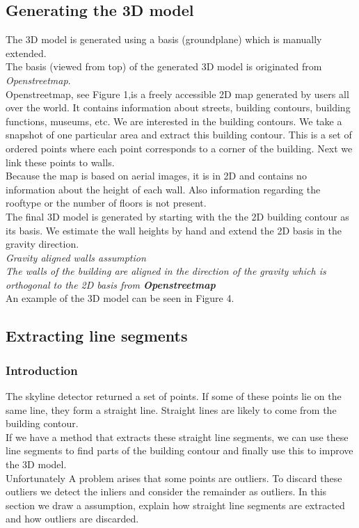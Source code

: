 \documentclass[10pt]{article}
\begin{document}
\subsection{Generating the 3D model}
The 3D model is generated using a basis (groundplane) which is manually extended.\\
The basis (viewed from top) of the generated 3D model is originated from
\emph{Openstreetmap}.\\
Openstreetmap, see Figure 1,is a freely accessible 2D map generated by
users all over the world. It contains information about streets, building
contours, building functions, museums, etc.  We are interested in the building
contours.  We take a snapshot of one particular area and extract this building
contour.  This is a set of ordered points where each point corresponds to a
corner of the building.  Next we link these points to walls.\\ 
Because the map is based on aerial images, it is in 2D and contains no
information about the height of each wall.  Also information regarding the
rooftype or the number of floors is not present.\\
The final 3D model is generated by starting with the the 2D building contour as
its basis. We estimate the wall heights by hand and extend the
2D basis in the gravity direction.\\
\emph{Gravity aligned walls assumption}\\
	\emph{The walls of the building are aligned in the direction of the gravity
	which is orthogonal to the 2D basis from \textbf{Openstreetmap}}\\

An example of the 3D model can be seen in Figure 4.\\




\subsection{Extracting line segments}


\subsubsection{Introduction}
	The skyline detector returned a set of points. If some of these points lie
	on the same line, they form a straight line.  Straight lines are likely to
	come from the building contour.\\
	If we have a method that extracts these straight line segments, we can use these
	line segments to find parts of the building contour and finally use this to
	improve the 3D model.\\
	Unfortunately A problem arises that some points are outliers. To discard these outliers
	we detect the inliers and consider the remainder as outliers.  In this
	section we draw a assumption, explain how straight line segments are extracted and how
	outliers are discarded.\\
\end{document}
